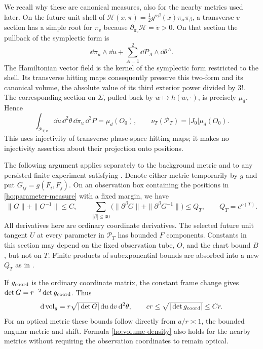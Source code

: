 We recall why these are canonical measures, also for the nearby metrics
used later.  On the future unit shell of
$\mathcal H(x,\pi)=\frac12g^{\alpha\beta}(x)\pi_\alpha\pi_\beta$,
a transverse $v$ section has a simple root for $\pi_v$ because
$\partial_{\pi_v}\mathcal H=\dot v>0$.  On that section the pullback of
the symplectic form is
\[
 \dd\pi_u\wedge\dd u+\sum_{A=1}^2\dd P_A\wedge\dd\theta^A.
\]
The Hamiltonian vector field is the kernel of the symplectic form
restricted to the shell.  Its transverse hitting maps consequently
preserve this two-form and its canonical volume, the absolute value of
its third exterior power divided by $3!$.  The corresponding
section on $\Sigma$, pulled back by $w\mapsto h(w,\cdot)$, is precisely
$\mu_d$.  Hence
\begin{equation}\label{ho:slice-volume}
 \int_{\mathcal P_{T,v}}\dd u\,\dd^2\theta\,\dd\pi_u\,\dd^2P
       =\mu_d(O_0),\qquad
 \nu_T(\mathcal P_T)=|J_0|\mu_d(O_0).
\end{equation}
This uses injectivity of transverse phase-space hitting maps; it makes
no injectivity assertion about their projection onto positions.

The following argument applies separately to the background metric and
to any persisted finite experiment satisfying
.  Denote either metric temporarily by $g$ and
put $G_{ij}=g(F_i,F_j)$.  On an observation box containing the positions
in \eqref{ho:parameter-measure} with a fixed margin, we have
\begin{equation}\label{ho:gram-assumptions}
 \|G\|+\|G^{-1}\|\le C,
 \qquad
 \sum_{|\beta|\le30}
 \bigl(\|\partial^\beta G\|+\|\partial^\beta G^{-1}\|\bigr)
       \le Q_T,\qquad Q_T=e^{o(T)}.
\end{equation}
All derivatives here are ordinary coordinate derivatives.
The selected future unit tangent $U$ at every parameter in
$\mathcal P_T$ has bounded $F$ components.  Constants in this section
may depend on the fixed observation tube, $O$, and the chart bound $B$,
but not on $T$.  Finite products of subexponential bounds are absorbed
into a new $Q_T$ as in .

If $g_{\rm coord}$ is the ordinary coordinate matrix, the constant
frame change gives
$\det G=r^{-2}\det g_{\rm coord}$.  Thus
\begin{equation}\label{ho:volume-density}
 \mathrm d\operatorname{vol}_g
     =r\sqrt{|\det G|}\,\mathrm d u\,\mathrm d v\,\mathrm d^2\theta,
 \qquad c r\le\sqrt{|\det g_{\rm coord}|}\le C r.
\end{equation}
For an optical metric these bounds follow directly from
$a/r\asymp1$, the bounded angular metric and shift.  Formula
\eqref{ho:volume-density} also holds for the nearby metrics without
requiring the observation coordinates to remain optical.

